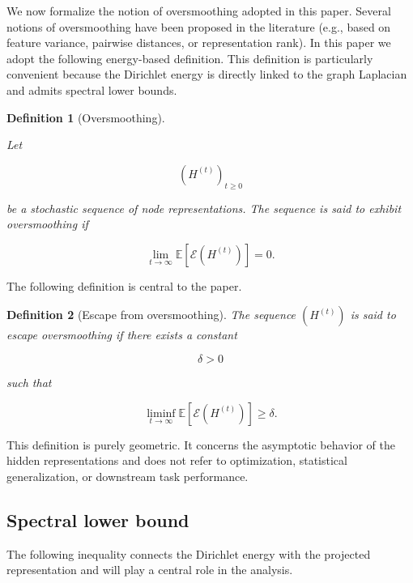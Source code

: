 \documentclass{article}
\newtheorem{definition}{Definition}[section]
\begin{document}
We now formalize the notion of oversmoothing adopted in this paper.
Several notions of oversmoothing have been proposed in the literature (e.g., based on feature variance, pairwise distances, or representation rank). In this paper we adopt the following energy-based definition.
This definition is particularly convenient because the Dirichlet energy is
directly linked to the graph Laplacian and admits spectral lower bounds.

\begin{definition}[Oversmoothing]
	\label{def:oversmoothing}
	
	Let
	
	\[
	(H^{(t)})_{t\ge0}
	\]
	
	be a stochastic sequence of node representations.	
	The sequence is said to exhibit
	\emph{oversmoothing}
	if
	
	\[
	\lim_{t\rightarrow\infty}
	\mathbb E
	\left[
	\mathcal E(H^{(t)})
	\right]
	=
	0.
	\]
	
\end{definition}

The following definition is central to the paper.

\begin{definition}[Escape from oversmoothing]
	\label{def:escape}
	The sequence
	$(H^{(t)})$
	is said to
	\emph{escape oversmoothing}
	if there exists a constant
	
	\[
	\delta>0
	\]
	
	such that
	
	\[
	\liminf_{t\rightarrow\infty}
	\mathbb E
	\left[
	\mathcal E(H^{(t)})
	\right]
	\ge
	\delta.
	\]
	
\end{definition}

This definition is purely geometric.
It concerns the asymptotic behavior of the hidden representations and does
not refer to optimization, statistical generalization, or downstream task
performance.

\subsection{Spectral lower bound}

The following inequality connects the Dirichlet energy with the projected
representation and will play a central role in the analysis.
\end{document}

